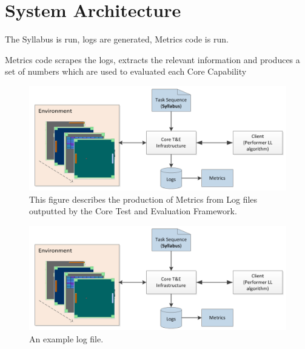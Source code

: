 \chapter{System Architecture}\label{ch:system_architechture}

The Syllabus is run, logs are generated, Metrics code is run.



Metrics code scrapes the logs, extracts the relevant information and produces a set of numbers which are used to evaluated each Core Capability





\begin{figure}[h]
	\centering
	\includegraphics[width=0.85\columnwidth]{sections/figs/metrics_diagram.png}
	\caption{This figure describes the production of Metrics from Log files outputted by the Core Test and Evaluation Framework.}
	\label{fig:system_layout}
\end{figure}



\begin{figure}[h]
	\centering
	\includegraphics[width=0.85\columnwidth]{sections/figs/metrics_diagram.png}
	\caption{An example log file.}
	\label{fig:system_layout}
\end{figure}

